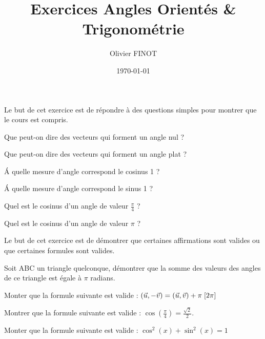 \documentclass{article}
\author{Olivier FINOT}
\date{\today}
\title{Exercices Angles Orientés \& Trigonométrie}
\begin{document}
	
\maketitle	
	
\begin{exercice}
	Le but de cet exercice est de répondre à des questions simples pour montrer que le cours est compris.
	
	\begin{multicols}{2}
	\begin{questions}
		\item Que peut-on dire des vecteurs qui forment un angle nul ?
		\item Que peut-on dire des vecteurs qui forment un angle plat ?
		\item \'A quelle mesure d'angle correspond le cosinus 1 ?
		\item \'A quelle mesure d'angle correspond le sinus 1 ?
		\item Quel est le cosinus d'un angle de valeur $\frac{\pi}{4}$ ?
		\item Quel est le cosinus d'un angle de valeur $\pi$ ?\\
		
	\end{questions}
	\end{multicols}
		
\end{exercice}

	
\begin{exercice}[Démonstrations]
		
	Le but de cet exercice est de démontrer que certaines affirmations sont valides ou que certaines formules sont valides.
		
	\begin{questions}
			
		\item Soit ABC un triangle quelconque, démontrer que la somme des valeurs des angles de ce triangle est égale à $\pi$ radians.
		
		\item Monter que la formule suivante est valide : $(\vec{u}, -\vec{v}) = (\vec{u}, \vec{v}) + \pi \; [2\pi]$
		\item Montrer que la formule suivante est valide : $\cos(\frac{\pi}{4}) = \frac{\sqrt{2}}{2}$.
		\item Monter que la formule suivante est valide : $\cos^2{(x)}+\sin^2{(x)} = 1$\\
			
	\end{questions}
		
\end{exercice}
	
\end{document}
